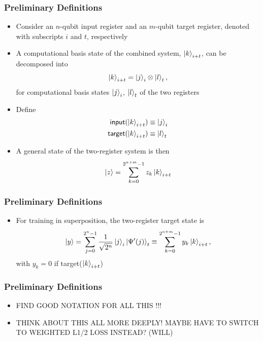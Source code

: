 \documentclass{beamer}
\begin{document}
\begin{frame}
\frametitle{Preliminary Definitions}
\begin{itemize}
\item Consider an $n$-qubit \alert{input register} and an $m$-qubit \alert{target register}, denoted with subscripts $i$ and $t$, respectively 
\item A computational basis state of the combined system, $\ket{k}_{i+t}$, can be decomposed into
\begin{equation}
\ket{k}_{i+t} = \ket{j}_i \otimes \ket{l}_t,
\end{equation}
for computational basis states $\ket{j}_i$, $\ket{l}_t$ of the two registers
\item Define 
\begin{align}
\mathsf{input}(\ket{k}_{i+t}) &\equiv \ket{j}_i \\
\mathsf{target}(\ket{k}_{i+t}) &\equiv \ket{l}_t \\
\end{align}
\item A \alert{general state of the two-register system} is then 
\begin{equation}
\ket{z} = \sum^{2^{n+m}-1}_{k=0} z_k \ket{k}_{i+t}
\end{equation}
\end{itemize}
\end{frame}

\begin{frame}
\frametitle{Preliminary Definitions}
\begin{itemize}
\item For training in superposition, the two-register target state is 
\begin{equation}
\ket{y} = \sum_{j=0}^{2^n -1} \frac{1}{\sqrt{2^n}} \ket{j}_i \ket{\Psi'(j)}_t \equiv \sum_{k=0}^{2^{n+m}-1} y_k \ket{k}_{i+t}, 
\end{equation}
with $y_k =0$ if target($\ket{k}_{i+t}$)
\end{itemize}
\end{frame}

\begin{frame}
\frametitle{Preliminary Definitions}
\begin{itemize}
\item FIND GOOD NOTATION FOR ALL THIS !!!
\item THINK ABOUT THIS ALL MORE DEEPLY! MAYBE HAVE TO SWITCH TO WEIGHTED L1/2 LOSS INSTEAD? (WILL)
\end{itemize}
\end{frame}
\end{document}

